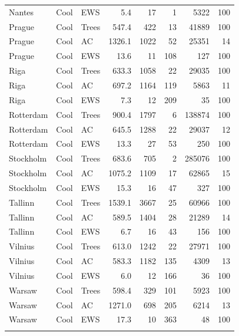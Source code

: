 \begin{longtable}{lllrrrrr}
  Nantes & Cool & EWS & 5.4 & 17 & 1 & 5322 & 100 \\ 
  Prague & Cool & Trees & 547.4 & 422 & 13 & 41889 & 100 \\ 
  Prague & Cool & AC & 1326.1 & 1022 & 52 & 25351 & 14 \\ 
  Prague & Cool & EWS & 13.6 & 11 & 108 & 127 & 100 \\ 
  Riga & Cool & Trees & 633.3 & 1058 & 22 & 29035 & 100 \\ 
  Riga & Cool & AC & 697.2 & 1164 & 119 & 5863 & 11 \\ 
  Riga & Cool & EWS & 7.3 & 12 & 209 & 35 & 100 \\ 
  Rotterdam & Cool & Trees & 900.4 & 1797 & 6 & 138874 & 100 \\ 
  Rotterdam & Cool & AC & 645.5 & 1288 & 22 & 29037 & 12 \\ 
  Rotterdam & Cool & EWS & 13.3 & 27 & 53 & 250 & 100 \\ 
  Stockholm & Cool & Trees & 683.6 & 705 & 2 & 285076 & 100 \\ 
  Stockholm & Cool & AC & 1075.2 & 1109 & 17 & 62865 & 15 \\ 
  Stockholm & Cool & EWS & 15.3 & 16 & 47 & 327 & 100 \\ 
  Tallinn & Cool & Trees & 1539.1 & 3667 & 25 & 60966 & 100 \\ 
  Tallinn & Cool & AC & 589.5 & 1404 & 28 & 21289 & 14 \\ 
  Tallinn & Cool & EWS & 6.7 & 16 & 43 & 156 & 100 \\ 
  Vilnius & Cool & Trees & 613.0 & 1242 & 22 & 27971 & 100 \\ 
  Vilnius & Cool & AC & 583.3 & 1182 & 135 & 4309 & 13 \\ 
  Vilnius & Cool & EWS & 6.0 & 12 & 166 & 36 & 100 \\ 
  Warsaw & Cool & Trees & 598.4 & 329 & 101 & 5923 & 100 \\ 
  Warsaw & Cool & AC & 1271.0 & 698 & 205 & 6214 & 13 \\ 
  Warsaw & Cool & EWS & 17.3 & 10 & 363 & 48 & 100 \\ 
   \bottomrule
\label{tab:cba_by_city}
\end{longtable}
\endgroup
